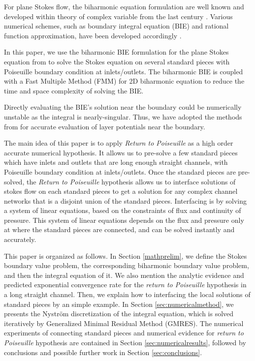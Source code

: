 \documentclass[10pt,twocolumn]{article}
\begin{document}
For plane Stokes flow, the biharmonic equation formulation are well known 
and developed within theory of complex variable from the last century \cite{ladyzhenskayaMathematicalTheoryViscous1964}. 
Various numerical schemes, such as boundary integral equation (BIE) and rational function approximation, 
have been developed accordingly \cite{greengardIntegralEquationMethods1996,trefethenApproximationTheoryApproximation2019}. 

In this paper, we use the biharmonic BIE formulation for the plane Stokes equation from 
\cite{greengardIntegralEquationMethods1996} to solve the Stokes equation on several standard pieces 
with Poiseuille boundary condition at inlets/outlets. 
The biharmonic BIE is coupled with a Fast Multiple Method (FMM) for 2D biharmonic equation
to reduce the time and space complexity of solving the BIE. \cite{FlatironinstituteFmm2d2022} 

Directly evaluating the BIE's solution near the boundary could be numerically unstable as the integral is nearly-singular.
Thus, we have adopted the methods from 
\cite{wuSolutionStokesFlow2020,helsingEvaluationLayerPotentials2008} 
for accurate evaluation of layer potentials near the boundary. 

The main idea of this paper is to apply \textit{Return to Poiseuille} as a 
high order accurate numerical hypothesis. It allows us to pre-solve a few standard pieces
which have inlets and outlets that are long enough straight channels, 
with Poiseuille boundary condition at inlets/outlets. 
Once the standard pieces are pre-solved, 
the \textit{Return to Poiseuille} hypothesis allows us to interface solutions of stokes flow on 
each standard pieces to get a solution for any complex channel networks that is a disjoint union of 
the standard pieces. 
Interfacing is by solving a system of linear equations, 
based on the constraints of flux and continuity of pressure. 
This system of linear equations depends on the flux and pressure only at where the standard pieces are connected, 
and can be solved instantly and accurately. 

This paper is organized as follows. In Section \ref{mathprelim}, we define the Stokes boundary value problem, 
the corresponding biharmonic boundary value problem, and then the integral equation of it. 
We also mention the analytic evidence and predicted exponential convergence rate for the 
\textit{return to Poiseuille} hypothesis in a long straight channel. 
Then, we explain how to interfacing the local solutions of standard pieces by an simple example. 
In Section \ref{sec:numericalmethod}, we presents the Nystr\"om discretization
of the integral equation, which is solved iteratively by 
Generalized Minimal Residual Method (GMRES). 
The numerical experiments of connecting standard pieces and numerical evidence for \textit{return to Poiseuille}
hypothesis are contained in Section \ref{sec:numericalresults}, 
followed by conclusions and possible further work in Section \ref{sec:conclusions}.
\end{document}
